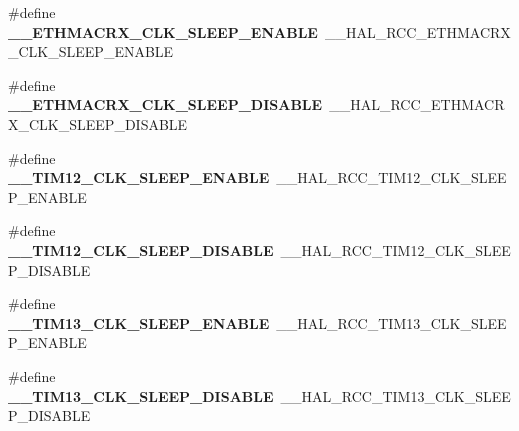 \begin{DoxyCompactItemize}
\item 
\hypertarget{group___h_a_l___r_c_c___aliased_gaa0ecc6517832ab5b303a184711cafe84}{\#define {\bfseries \-\_\-\-\_\-\-E\-T\-H\-M\-A\-C\-R\-X\-\_\-\-C\-L\-K\-\_\-\-S\-L\-E\-E\-P\-\_\-\-E\-N\-A\-B\-L\-E}~\-\_\-\-\_\-\-H\-A\-L\-\_\-\-R\-C\-C\-\_\-\-E\-T\-H\-M\-A\-C\-R\-X\-\_\-\-C\-L\-K\-\_\-\-S\-L\-E\-E\-P\-\_\-\-E\-N\-A\-B\-L\-E}\label{group___h_a_l___r_c_c___aliased_gaa0ecc6517832ab5b303a184711cafe84}

\item 
\hypertarget{group___h_a_l___r_c_c___aliased_gacf62579e4ae8ccbd5acef2cbc3ca7156}{\#define {\bfseries \-\_\-\-\_\-\-E\-T\-H\-M\-A\-C\-R\-X\-\_\-\-C\-L\-K\-\_\-\-S\-L\-E\-E\-P\-\_\-\-D\-I\-S\-A\-B\-L\-E}~\-\_\-\-\_\-\-H\-A\-L\-\_\-\-R\-C\-C\-\_\-\-E\-T\-H\-M\-A\-C\-R\-X\-\_\-\-C\-L\-K\-\_\-\-S\-L\-E\-E\-P\-\_\-\-D\-I\-S\-A\-B\-L\-E}\label{group___h_a_l___r_c_c___aliased_gacf62579e4ae8ccbd5acef2cbc3ca7156}

\item 
\hypertarget{group___h_a_l___r_c_c___aliased_gaa109db9698df3dd4643a186a11058390}{\#define {\bfseries \-\_\-\-\_\-\-T\-I\-M12\-\_\-\-C\-L\-K\-\_\-\-S\-L\-E\-E\-P\-\_\-\-E\-N\-A\-B\-L\-E}~\-\_\-\-\_\-\-H\-A\-L\-\_\-\-R\-C\-C\-\_\-\-T\-I\-M12\-\_\-\-C\-L\-K\-\_\-\-S\-L\-E\-E\-P\-\_\-\-E\-N\-A\-B\-L\-E}\label{group___h_a_l___r_c_c___aliased_gaa109db9698df3dd4643a186a11058390}

\item 
\hypertarget{group___h_a_l___r_c_c___aliased_gaf929e8c66960c8ea6504cfd0045f152b}{\#define {\bfseries \-\_\-\-\_\-\-T\-I\-M12\-\_\-\-C\-L\-K\-\_\-\-S\-L\-E\-E\-P\-\_\-\-D\-I\-S\-A\-B\-L\-E}~\-\_\-\-\_\-\-H\-A\-L\-\_\-\-R\-C\-C\-\_\-\-T\-I\-M12\-\_\-\-C\-L\-K\-\_\-\-S\-L\-E\-E\-P\-\_\-\-D\-I\-S\-A\-B\-L\-E}\label{group___h_a_l___r_c_c___aliased_gaf929e8c66960c8ea6504cfd0045f152b}

\item 
\hypertarget{group___h_a_l___r_c_c___aliased_ga77169f2e1382485bcd9659b59f89e124}{\#define {\bfseries \-\_\-\-\_\-\-T\-I\-M13\-\_\-\-C\-L\-K\-\_\-\-S\-L\-E\-E\-P\-\_\-\-E\-N\-A\-B\-L\-E}~\-\_\-\-\_\-\-H\-A\-L\-\_\-\-R\-C\-C\-\_\-\-T\-I\-M13\-\_\-\-C\-L\-K\-\_\-\-S\-L\-E\-E\-P\-\_\-\-E\-N\-A\-B\-L\-E}\label{group___h_a_l___r_c_c___aliased_ga77169f2e1382485bcd9659b59f89e124}

\item 
\hypertarget{group___h_a_l___r_c_c___aliased_ga880e7b66246643be14a3c67d5b60ee81}{\#define {\bfseries \-\_\-\-\_\-\-T\-I\-M13\-\_\-\-C\-L\-K\-\_\-\-S\-L\-E\-E\-P\-\_\-\-D\-I\-S\-A\-B\-L\-E}~\-\_\-\-\_\-\-H\-A\-L\-\_\-\-R\-C\-C\-\_\-\-T\-I\-M13\-\_\-\-C\-L\-K\-\_\-\-S\-L\-E\-E\-P\-\_\-\-D\-I\-S\-A\-B\-L\-E}\label{group___h_a_l___r_c_c___aliased_ga880e7b66246643be14a3c67d5b60ee81}


\end{DoxyCompactItemize}
